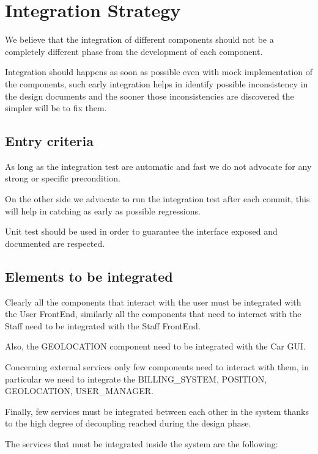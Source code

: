 \documentclass[11pt]{article} %
\begin{document}
\newpage
\section{Integration Strategy}

We believe that the integration of different components should not be a completely different phase from the development of each component.

Integration should happens as soon as possible even with mock implementation of the components, such early integration helps in identify possible inconsistency in the design documents and the sooner those inconsistencies are discovered the simpler will be to fix them.

\subsection{Entry criteria}

As long as the integration test are automatic and fast we do not advocate for any strong or specific precondition.

On the other side we advocate to run the integration test after each commit, this will help in catching as early as possible regressions.

Unit test should be used in order to guarantee the interface exposed and documented are respected.

\subsection{Elements to be integrated}

Clearly all the components that interact with the user must be integrated with the User FrontEnd, similarly all the components that need to interact with the Staff need to be integrated with the Staff FrontEnd.

Also, the GEOLOCATION component need to be integrated with the Car GUI.

Concerning external services only few components need to interact with them, in particular we need to integrate the BILLING\_SYSTEM, POSITION, GEOLOCATION, USER\_MANAGER.

Finally, few services must be integrated between each other in the system thanks to the high degree of decoupling reached during the design phase.

The services that must be integrated inside the system are the following:
\end{document}
